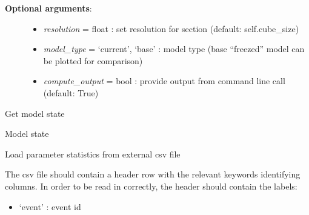 \documentclass[a4paper,10pt,english]{sphinxmanual}
\begin{document}
\begin{fulllineitems}
\begin{fulllineitems}
\begin{description}
\begin{itemize}
\begin{description}
\end{description}

\end{itemize}

\item[{\textbf{Optional arguments}:}] \leavevmode\begin{itemize}
\item {} 
\emph{resolution} = float : set resolution for section (default: self.cube\_size)

\item {} 
\emph{model\_type} = `current', `base' : model type (base ``freezed'' model can be plotted for comparison)

\item {} 
\emph{compute\_output} = bool : provide output from command line call (default: True)

\end{itemize}

\end{description}

\end{fulllineitems}


\begin{fulllineitems}
\label{pynoddy:pynoddy.experiment.Experiment.get_up_to_date}
Get model state

\end{fulllineitems}


\begin{fulllineitems}
\label{pynoddy:pynoddy.experiment.Experiment.is_up_to_date}
Model state

\end{fulllineitems}


\begin{fulllineitems}
\label{pynoddy:pynoddy.experiment.Experiment.load_parameter_file}
Load parameter statistics from external csv file

The csv file should contain a header row with the relevant keywords identifying columns. 
In order to be read in correctly, the header should contain the labels:
\begin{itemize}
\item {} 
`event' : event id


\end{itemize}
\end{fulllineitems}
\end{fulllineitems}
\end{document}
